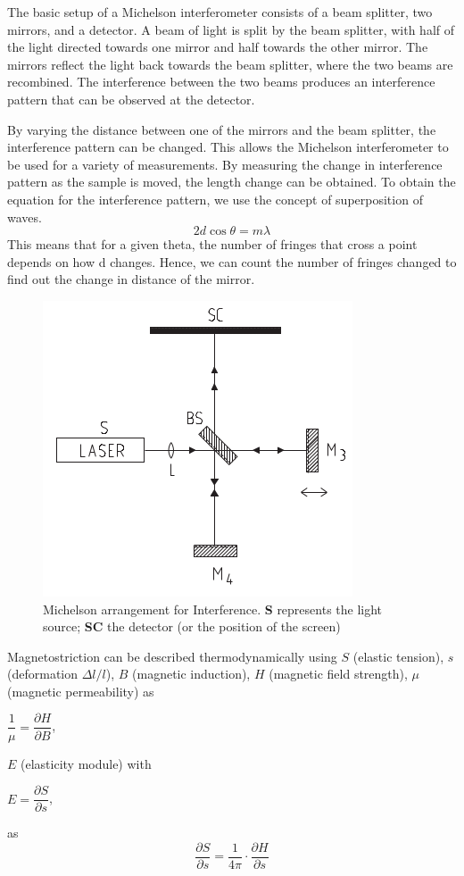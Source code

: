 The basic setup of a Michelson interferometer consists of a beam splitter, two mirrors, and a detector. A beam of light is split by the beam splitter, with half of the light directed towards one mirror and half towards the other mirror. The mirrors reflect the light back towards the beam splitter, where the two beams are recombined. The interference between the two beams produces an interference pattern that can be observed at the detector.

By varying the distance between one of the mirrors and the beam splitter, the interference pattern can be changed. This allows the Michelson interferometer to be used for a variety of measurements. By measuring the change in interference pattern as the sample is moved, the length change can be obtained.
To obtain the equation for the interference pattern, we use the concept of superposition of waves.
\begin{equation}
	2 d \cos \theta = m \lambda
\end{equation}
This means that for a given theta, the number of fringes that cross a point depends on how d changes. Hence, we can count the number of fringes changed to find out the change in distance of the mirror.
\begin{figure}
	\centering
	\includegraphics[width=0.7\linewidth]{mich}
	\caption{Michelson arrangement for Interference. \textbf{S} represents
		the light source; \textbf{SC} the detector (or the position of the
		screen)}
	\label{fig:mich}
\end{figure}

Magnetostriction can be described thermodynamically using $S$ (elastic tension), $s$ (deformation $\Delta l/l$), $B$ (magnetic induction), $H$ (magnetic field strength), $\mu$ (magnetic permeability) as
\begin{center}
	$\dfrac{1}{\mu} = \dfrac{\partial H}{\partial B}$,
\end{center}
$E$ (elasticity module) with
\begin{center}
	$E = \dfrac{\partial S}{\partial s}$,
\end{center}
as
\begin{equation}
	\dfrac{\partial S}{\partial s} = \dfrac{1}{4 \pi} \cdot \dfrac{\partial H}{\partial s}
\end{equation}
